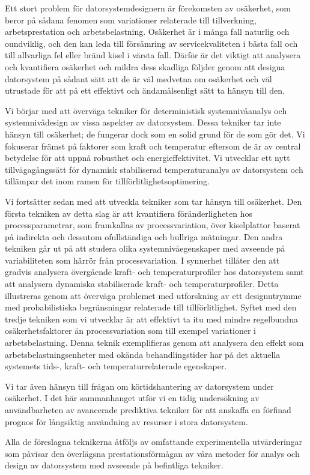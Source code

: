 Ett stort problem för datorsystemdesignern är förekomsten av osäkerhet, som
beror på sådana fenomen som variationer relaterade till tillverkning,
arbetsprestation och arbetsbelastning. Osäkerhet är i många fall naturlig och
oundviklig, och den kan leda till försämring av servicekvaliteten i bästa fall
och till allvarliga fel eller bränd kisel i värsta fall. Därför är det viktigt
att analysera och kvantifiera osäkerhet och mildra dess skadliga följder genom
att designa datorsystem på sådant sätt att de är väl medvetna om osäkerhet och
väl utrustade för att på ett effektivt och ändamålsenligt sätt ta hänsyn till
den.

Vi börjar med att överväga tekniker för deterministisk systemnivåanalys och
systemnivådesign av vissa aspekter av datorsystem. Dessa tekniker tar inte
hänsyn till osäkerhet; de fungerar dock som en solid grund för de som gör det.
Vi fokuserar främst på faktorer som kraft och temperatur eftersom de är av
central betydelse för att uppnå robusthet och energieffektivitet. Vi utvecklar
ett nytt tillvägagångssätt för dynamisk stabiliserad temperaturanalys av
datorsystem och tillämpar det inom ramen för tillförlitlighetsoptimering.

Vi fortsätter sedan med att utveckla tekniker som tar hänsyn till osäkerhet. Den
första tekniken av detta slag är att kvantifiera föränderligheten hos
processparametrar, som framkallas av processvariation, över kiselplattor baserat
på indirekta och dessutom ofullständiga och bullriga mätningar. Den andra
tekniken går ut på att studera olika systemnivåegenskaper med avseende på
variabiliteten som härrör från processvariation. I synnerhet tillåter den att
gradvis analysera övergående kraft- och temperaturprofiler hos datorsystem samt
att analysera dynamiska stabiliserade kraft- och temperaturprofiler. Detta
illustreras genom att överväga problemet med utforskning av ett designutrymme
med probabilistiska begränsningar relaterade till tillförlitlighet. Syftet med
den tredje tekniken som vi utvecklar är att effektivt ta itu med mindre
regelbundna osäkerhetsfaktorer än processvariation som till exempel variationer
i arbetsbelastning. Denna teknik exemplifieras genom att analysera den effekt
som arbetsbelastningsenheter med okända behandlingstider har på det aktuella
systemets tids-, kraft- och temperaturrelaterade egenskaper.

Vi tar även hänsyn till frågan om körtidshantering av datorsystem under
osäkerhet. I det här sammanhanget utför vi en tidig undersökning av
användbarheten av avancerade prediktiva tekniker för att anskaffa en förfinad
prognos för långsiktig användning av resurser i stora datorsystem.

Alla de föreslagna teknikerna åtföljs av omfattande experimentella utvärderingar
som påvisar den överlägsna prestationsförmågan av våra metoder för analys och
design av datorsystem med avseende på befintliga tekniker.

